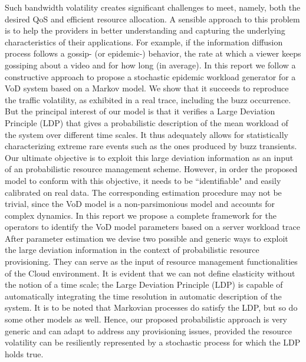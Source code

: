\documentclass[twoside]{article}
\newcommand{\roy}[2]{#2}
\begin{document}
Such bandwidth volatility creates significant challenges to meet, namely, both the desired QoS and efficient resource allocation. \roy{}{A sensible} approach to this problem is to help the providers in better understanding and capturing the underlying characteristics of their applications. For example, if the information diffusion process follows a gossip\roy{}{-} (or epidemic\roy{}{-}) behavior, the rate at which a \roy{customer}{viewer} \roy{}{keeps gossiping about a video and for how long (in average)}.\newline
In this report we follow a constructive approach to propose a stochastic epidemic workload generator for a VoD system based on a Markov model. We show that it succeeds to reproduce the traffic volatility, as exhibited in a real trace, including the buzz occurrence. But the principal interest of our model is that it verifies a Large Deviation Principle (LDP) that gives a probabilistic description of the mean workload of the system over different time scales. It thus adequately allows for statistically characterizing extreme rare events such as the ones produced by buzz transients. Our ultimate objective is to exploit this large deviation information as an input of an \roy{adaptive}{probabilistic} resource management scheme. However, in order the proposed model to conform with this objective, it needs to be ``identifiable" and easily calibrated on real data. The corresponding estimation procedure may not be trivial, since the VoD model is a non-parsimonious model and accounts for \roy{a}{}complex dynamics. In this report we propose a complete framework for the operators to identify the VoD model parameters based on a server workload trace\newline
After parameter estimation we devise two possible and generic ways to exploit the large deviation information in the context of probabilistic resource provisioning. They can serve as the input of resource management functionalities of the Cloud environment. It is evident that we can not define elasticity without the notion of a time scale; the Large Deviation Principle (LDP) is capable of automatically integrating the time resolution in automatic description of the system. It is to be noted that Markovian processes do satisfy the LDP, but so do some other models as well. Hence, our proposed probabilistic approach is very generic and can adapt to address any provisioning issues, provided the resource volatility can be resiliently represented by a stochastic process for which the LDP holds true. \newline
\end{document}
